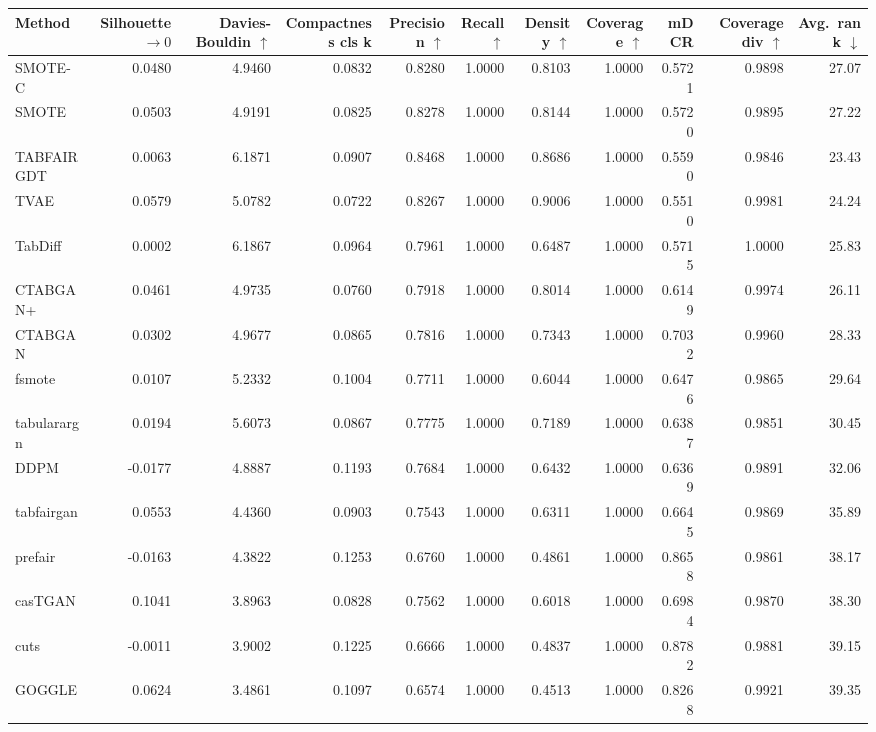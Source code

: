 \begin{table}[t]
\centering
\scriptsize
\setlength\tabcolsep{3pt}
\begin{tabular}{lrrrrrrrrrr}
\toprule
\textbf{Method} & \textbf{Silhouette} $\rightarrow 0$ & \textbf{Davies-Bouldin} $\uparrow$ & \textbf{Compactness cls k}  & \textbf{Precision} $\uparrow$ & \textbf{Recall} $\uparrow$ & \textbf{Density} $\uparrow$ & \textbf{Coverage} $\uparrow$ & \textbf{mDCR}  & \textbf{Coverage div} $\uparrow$ & \textbf{Avg.\ rank} $\downarrow$ \\
\midrule
SMOTE-C & 0.0480 & 4.9460 & 0.0832 & 0.8280 & 1.0000 & 0.8103 & 1.0000 & 0.5721 & 0.9898 & 27.07 \\
SMOTE & 0.0503 & 4.9191 & 0.0825 & 0.8278 & 1.0000 & 0.8144 & 1.0000 & 0.5720 & 0.9895 & 27.22 \\
\midrule
TABFAIRGDT & 0.0063 & 6.1871 & 0.0907 & 0.8468 & 1.0000 & 0.8686 & 1.0000 & 0.5590 & 0.9846 & 23.43 \\
TVAE & 0.0579 & 5.0782 & 0.0722 & 0.8267 & 1.0000 & 0.9006 & 1.0000 & 0.5510 & 0.9981 & 24.24 \\
TabDiff & 0.0002 & 6.1867 & 0.0964 & 0.7961 & 1.0000 & 0.6487 & 1.0000 & 0.5715 & 1.0000 & 25.83 \\
CTABGAN+ & 0.0461 & 4.9735 & 0.0760 & 0.7918 & 1.0000 & 0.8014 & 1.0000 & 0.6149 & 0.9974 & 26.11 \\
CTABGAN & 0.0302 & 4.9677 & 0.0865 & 0.7816 & 1.0000 & 0.7343 & 1.0000 & 0.7032 & 0.9960 & 28.33 \\
fsmote & 0.0107 & 5.2332 & 0.1004 & 0.7711 & 1.0000 & 0.6044 & 1.0000 & 0.6476 & 0.9865 & 29.64 \\
tabularargn & 0.0194 & 5.6073 & 0.0867 & 0.7775 & 1.0000 & 0.7189 & 1.0000 & 0.6387 & 0.9851 & 30.45 \\
DDPM & -0.0177 & 4.8887 & 0.1193 & 0.7684 & 1.0000 & 0.6432 & 1.0000 & 0.6369 & 0.9891 & 32.06 \\
tabfairgan & 0.0553 & 4.4360 & 0.0903 & 0.7543 & 1.0000 & 0.6311 & 1.0000 & 0.6645 & 0.9869 & 35.89 \\
prefair & -0.0163 & 4.3822 & 0.1253 & 0.6760 & 1.0000 & 0.4861 & 1.0000 & 0.8658 & 0.9861 & 38.17 \\
casTGAN & 0.1041 & 3.8963 & 0.0828 & 0.7562 & 1.0000 & 0.6018 & 1.0000 & 0.6984 & 0.9870 & 38.30 \\
cuts & -0.0011 & 3.9002 & 0.1225 & 0.6666 & 1.0000 & 0.4837 & 1.0000 & 0.8782 & 0.9881 & 39.15 \\
GOGGLE & 0.0624 & 3.4861 & 0.1097 & 0.6574 & 1.0000 & 0.4513 & 1.0000 & 0.8268 & 0.9921 & 39.35 \\

\end{tabular}
\end{table}
